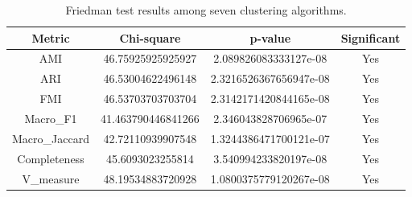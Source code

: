 
\begin{table}[ht]
\centering
\caption{Friedman test results among seven clustering algorithms.}
\label{tab:friedman}

\begin{tabular}{cccc}
\toprule
Metric & Chi-square & p-value & Significant & \\
\midrule
AMI & 46.75925925925927 & 2.089826083333127e-08 & Yes\\
ARI & 46.53004622496148 & 2.3216526367656947e-08 & Yes\\
FMI & 46.53703703703704 & 2.3142171420844165e-08 & Yes\\
Macro_F1 & 41.463790446841266 & 2.346043828706965e-07 & Yes\\
Macro_Jaccard & 42.72110939907548 & 1.3244386471700121e-07 & Yes\\
Completeness & 45.6093023255814 & 3.540994233820197e-08 & Yes\\
V_measure & 48.19534883720928 & 1.0800375779120267e-08 & Yes\\

\bottomrule
\end{tabular}
\end{table}
